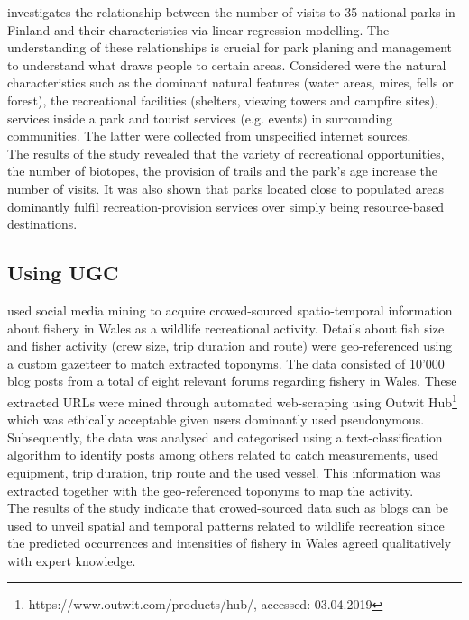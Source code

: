 \textcite{Neuvonen2010} investigates the relationship between the number of visits to 35 national parks in Finland and their characteristics via linear regression modelling. The understanding of these relationships is crucial for park planing and management to understand what draws people to certain areas. Considered were the natural characteristics such as the dominant natural features (water areas, mires, fells or forest), the recreational facilities (shelters, viewing towers and campfire sites), services inside a park and tourist services (e.g. events) in surrounding communities. The latter were collected from unspecified internet sources.\\
The results of the study revealed that the variety of recreational opportunities, the number of biotopes, the provision of trails and the park's age increase the number of visits. It was also shown that parks located close to populated areas dominantly fulfil recreation-provision services over simply being resource-based destinations.

\subsection{Using UGC} 

\textcite{Monkman2018} used social media mining to acquire crowed-sourced spatio-temporal information about fishery in Wales as a wildlife recreational activity. Details about fish size and fisher activity (crew size, trip duration and route) were geo-referenced using a custom gazetteer to match extracted toponyms. The data consisted of 10'000 blog posts from a total of eight relevant forums regarding fishery in Wales. These extracted URLs were mined through automated web-scraping using Outwit Hub\footnote{https://www.outwit.com/products/hub/, accessed: 03.04.2019} which was ethically acceptable given users dominantly used pseudonymous. Subsequently, the data was analysed and categorised using a text-classification algorithm to identify posts among others related to catch measurements, used equipment, trip duration, trip route and the used vessel. This information was extracted together with the geo-referenced toponyms to map the activity. \\
The results of the study indicate that crowed-sourced data such as blogs can be used to unveil spatial and temporal patterns related to wildlife recreation since the predicted occurrences and intensities of fishery in Wales agreed qualitatively with expert knowledge. \\

